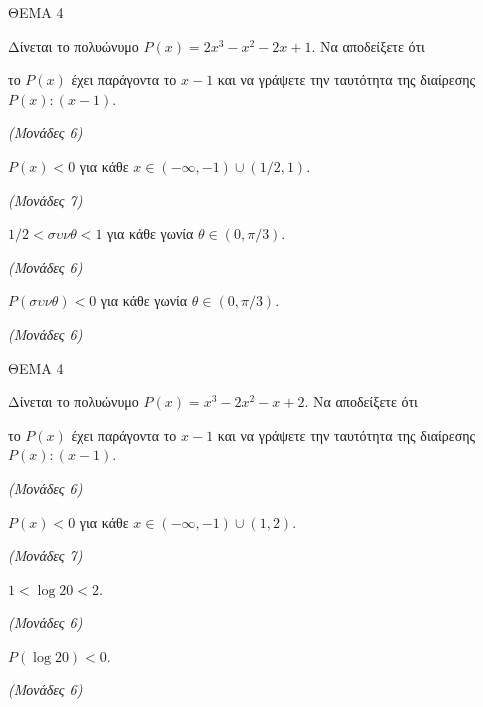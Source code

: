 \documentclass[11pt,a4paper,twoside]{book}
\newcommand{\monades}[1]{\hfill \textit{(Μονάδες #1)}}
\begin{document}
\vspace{4mm}

ΘΕΜΑ 4

Δίνεται το πολυώνυμο $P(x) = 2x^3 - x^2 - 2x + 1$. Να αποδείξετε ότι

\begin{alist}
\item το $P(x)$ έχει παράγοντα το $x - 1$ και να γράψετε την ταυτότητα της διαίρεσης $P(x) : (x - 1)$.

\monades{6}

\item $P(x) < 0$ για κάθε $x \in (-\infty, -1) \cup (1/2, 1)$.

\monades{7}

\item $1/2 < \sigma\upsilon\nu \theta < 1$ για κάθε γωνία $\theta \in (0, \pi/3)$.

\monades{6}

\item $P(\sigma\upsilon\nu \theta) < 0$ για κάθε γωνία $\theta \in (0, \pi/3)$.

\monades{6}
\end{alist}

\vspace{4mm}

ΘΕΜΑ 4

Δίνεται το πολυώνυμο $P(x) = x^3 - 2x^2 - x + 2$. Να αποδείξετε ότι

\begin{alist}
\item το $P(x)$ έχει παράγοντα το $x - 1$ και να γράψετε την ταυτότητα της διαίρεσης $P(x) : (x - 1)$.

\monades{6}

\item $P(x) < 0$ για κάθε $x \in (-\infty, -1) \cup (1, 2)$.

\monades{7}

\item $1 < \log 20 < 2$.

\monades{6}

\item $P(\log 20) < 0$.

\monades{6}
\end{alist}

\vspace{4mm}
\end{document}
